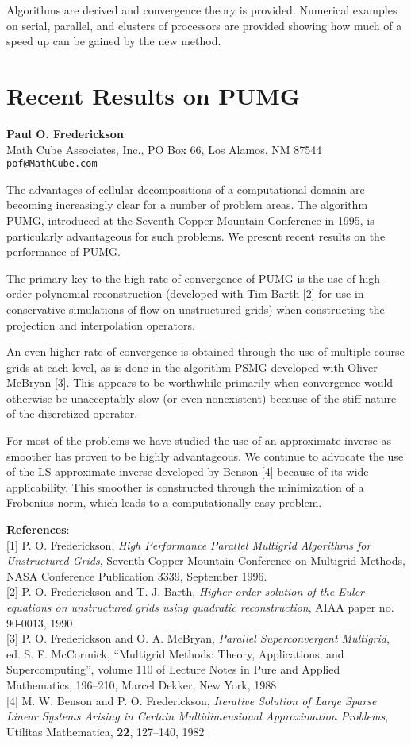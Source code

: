 \documentclass[11pt]{article}
\newcommand{\nextab}[4]{
	\section{#2}
	{\bf #1} \\ \nopagebreak
	{#3} \\ \nopagebreak
	{\tt #4} \nopagebreak
	}
\begin{document}
Algorithms are derived and convergence theory is provided.  Numerical examples
on serial, parallel, and clusters of processors are provided showing how much
of a speed up can be gained by the new method.


\nextab{Paul O. Frederickson}
	{Recent Results on PUMG}
	{Math Cube Associates, Inc.,
		PO Box 66, Los Alamos, NM 87544}
	{pof@MathCube.com}

The advantages of cellular decompositions of a computational domain
are becoming increasingly clear for a number of problem areas.  The
algorithm PUMG, introduced at the Seventh Copper Mountain Conference
in 1995, is particularly advantageous for such problems.  We present
recent results on the performance of PUMG.

The primary key to the
high rate of convergence of PUMG is the use of high-order polynomial
reconstruction (developed with Tim Barth [2] for use in conservative
simulations of flow on unstructured grids) when constructing the
projection and interpolation operators.

 An even higher rate of
convergence is obtained through the use of multiple course grids at
each level, as is done in the algorithm PSMG developed with Oliver
McBryan [3].  This appears to be worthwhile primarily when convergence
would otherwise be unacceptably slow (or even nonexistent) because of
the stiff nature of the discretized operator.

 For most of the
problems we have studied the use of an approximate inverse as smoother
has proven to be highly advantageous.  We continue to advocate the use
of the LS approximate inverse developed by Benson [4] because of its
wide applicability.  This smoother is constructed through the
minimization of a Frobenius norm, which leads to a computationally
easy problem.

{\bf References}:
\\{}
[1]  P. O. Frederickson,
{\em High Performance Parallel Multigrid
Algorithms for Unstructured Grids},
Seventh Copper Mountain Conference on Multigrid Methods,
NASA Conference Publication 3339, September 1996.
\\{}
[2]  P. O. Frederickson and T. J. Barth,
{\em Higher order solution of the Euler equations on unstructured
grids using quadratic reconstruction},
AIAA paper no. 90-0013, 1990
\\{}
[3]  P. O.
Frederickson and O. A. McBryan,
{\em Parallel Superconvergent Multigrid},
ed. S. F. McCormick, ``Multigrid Methods:  Theory, Applications,
and Supercomputing'',
volume 110 of Lecture Notes in Pure and Applied
Mathematics, 196--210, Marcel Dekker, New York, 1988
\\{}
[4]
M. W. Benson and P. O. Frederickson,
{\em Iterative Solution of Large
Sparse Linear Systems Arising in Certain Multidimensional
Approximation Problems},
Utilitas Mathematica, {\bf 22}, 127--140, 1982
\end{document}
